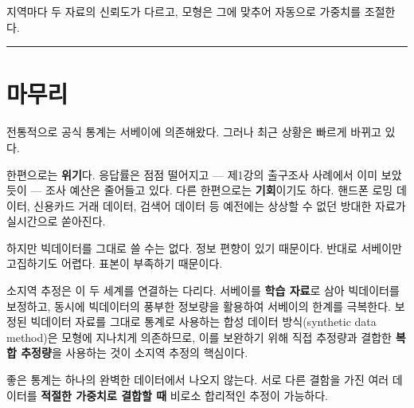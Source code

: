 \documentclass[
  letterpaper,
  DIV=11,
  numbers=noendperiod]{scrreprt}
\begin{document}
지역마다 두 자료의 신뢰도가 다르고, 모형은 그에 맞추어 자동으로 가중치를
조절한다.

\begin{center}\rule{0.5\linewidth}{0.5pt}\end{center}

\section{마무리}\label{uxb9c8uxbb34uxb9ac-1}

전통적으로 공식 통계는 서베이에 의존해왔다. 그러나 최근 상황은 빠르게
바뀌고 있다.

한편으로는 \textbf{위기}다. 응답률은 점점 떨어지고 --- 제1강의 출구조사
사례에서 이미 보았듯이 --- 조사 예산은 줄어들고 있다. 다른 한편으로는
\textbf{기회}이기도 하다. 핸드폰 로밍 데이터, 신용카드 거래 데이터,
검색어 데이터 등 예전에는 상상할 수 없던 방대한 자료가 실시간으로
쏟아진다.

하지만 빅데이터를 그대로 쓸 수는 없다. 정보 편향이 있기 때문이다. 반대로
서베이만 고집하기도 어렵다. 표본이 부족하기 때문이다.

소지역 추정은 이 두 세계를 연결하는 다리다. 서베이를 \textbf{학습
자료}로 삼아 빅데이터를 보정하고, 동시에 빅데이터의 풍부한 정보량을
활용하여 서베이의 한계를 극복한다. 보정된 빅데이터 자료를 그대로 통계로
사용하는 합성 데이터 방식(synthetic data method)은 모형에 지나치게
의존하므로, 이를 보완하기 위해 직접 추정량과 결합한 \textbf{복합
추정량}을 사용하는 것이 소지역 추정의 핵심이다.

\begin{tcolorbox}[enhanced jigsaw, arc=.35mm, bottomrule=.15mm, bottomtitle=1mm, breakable, colback=white, colbacktitle=quarto-callout-important-color!10!white, colframe=quarto-callout-important-color-frame, coltitle=black, left=2mm, leftrule=.75mm, opacityback=0, opacitybacktitle=0.6, rightrule=.15mm, title=\textcolor{quarto-callout-important-color}{\faExclamation}\hspace{0.5em}{결론}, titlerule=0mm, toprule=.15mm, toptitle=1mm]

좋은 통계는 하나의 완벽한 데이터에서 나오지 않는다. 서로 다른 결함을
가진 여러 데이터를 \textbf{적절한 가중치로 결합할 때} 비로소 합리적인
추정이 가능하다.

\end{tcolorbox}
\end{document}
